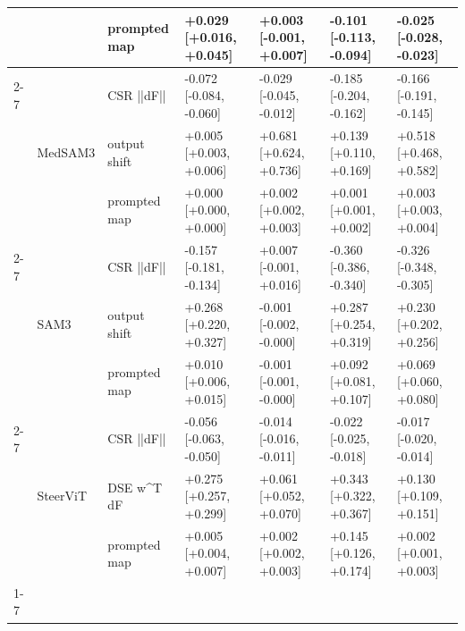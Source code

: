 \begin{tabular}{lllllll}
 &  & prompted map & +0.029 [+0.016, +0.045] & +0.003 [-0.001, +0.007] & -0.101 [-0.113, -0.094] & -0.025 [-0.028, -0.023] \\
\cline{2-7}
 & \multirow[t]{3}{*}{MedSAM3} & CSR  ||dF|| & -0.072 [-0.084, -0.060] & -0.029 [-0.045, -0.012] & -0.185 [-0.204, -0.162] & -0.166 [-0.191, -0.145] \\
 &  & output shift & +0.005 [+0.003, +0.006] & +0.681 [+0.624, +0.736] & +0.139 [+0.110, +0.169] & +0.518 [+0.468, +0.582] \\
 &  & prompted map & +0.000 [+0.000, +0.000] & +0.002 [+0.002, +0.003] & +0.001 [+0.001, +0.002] & +0.003 [+0.003, +0.004] \\
\cline{2-7}
 & \multirow[t]{3}{*}{SAM3} & CSR  ||dF|| & -0.157 [-0.181, -0.134] & +0.007 [-0.001, +0.016] & -0.360 [-0.386, -0.340] & -0.326 [-0.348, -0.305] \\
 &  & output shift & +0.268 [+0.220, +0.327] & -0.001 [-0.002, -0.000] & +0.287 [+0.254, +0.319] & +0.230 [+0.202, +0.256] \\
 &  & prompted map & +0.010 [+0.006, +0.015] & -0.001 [-0.001, -0.000] & +0.092 [+0.081, +0.107] & +0.069 [+0.060, +0.080] \\
\cline{2-7}
 & \multirow[t]{3}{*}{SteerViT} & CSR  ||dF|| & -0.056 [-0.063, -0.050] & -0.014 [-0.016, -0.011] & -0.022 [-0.025, -0.018] & -0.017 [-0.020, -0.014] \\
 &  & DSE  w^T dF & +0.275 [+0.257, +0.299] & +0.061 [+0.052, +0.070] & +0.343 [+0.322, +0.367] & +0.130 [+0.109, +0.151] \\
 &  & prompted map & +0.005 [+0.004, +0.007] & +0.002 [+0.002, +0.003] & +0.145 [+0.126, +0.174] & +0.002 [+0.001, +0.003] \\
\cline{1-7} \cline{2-7}
\bottomrule
\end{tabular}
